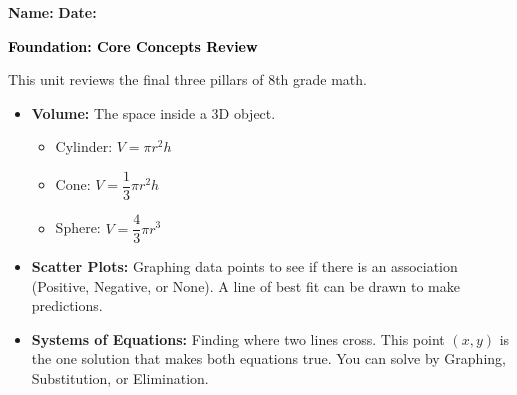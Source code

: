 \documentclass[12pt, letterpaper, fleqn]{article}
\begin{document}
\textbf{Name:} \underline{\hspace{5cm}}
\hfill
\textbf{Date:} \underline{\hspace{3cm}}\\

\begin{tcolorbox}[colback=customteal!20]
    \large\textcolor{black}{\textbf{Foundation: Core Concepts Review}}
\end{tcolorbox}

\vspace{3mm}

\noindent
This unit reviews the final three pillars of 8th grade math.

\begin{itemize}
    \item \textbf{Volume:} The space inside a 3D object.
    \begin{itemize}
        \item Cylinder: $V = \pi r^2 h$
        \item Cone: $V = \dfrac{1}{3}\pi r^2 h$
        \item Sphere: $V = \dfrac{4}{3}\pi r^3$
    \end{itemize}
    \item \textbf{Scatter Plots:} Graphing data points to see if there is an association (Positive, Negative, or None). A line of best fit can be drawn to make predictions.
    \item \textbf{Systems of Equations:} Finding where two lines cross. This point $(x,y)$ is the one solution that makes both equations true. You can solve by Graphing, Substitution, or Elimination.
\end{itemize}

\vspace{4mm}
\end{document}
